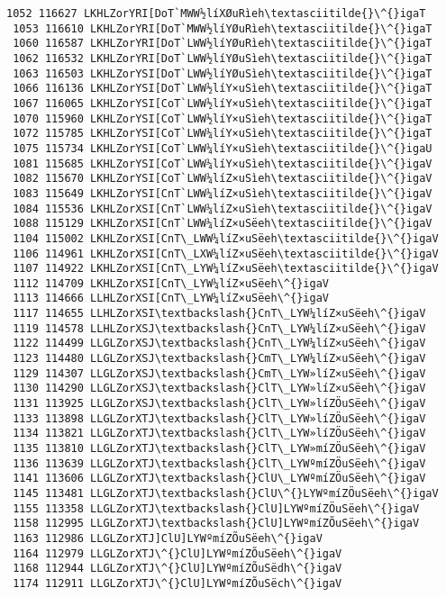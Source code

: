 \documentclass[11pt]{article}
\begin{document}
\begin{Verbatim}[commandchars=\\\{\}]
 1052 116627 LKHLZorYRI[DoT`MWW½líXØuRìeh\textasciitilde{}\^{}igaT
 1053 116610 LKHLZorYRI[DoT`MWW½líYØuRìeh\textasciitilde{}\^{}igaT
 1060 116587 LKHLZorYRI[DoT`LWW½líYØuRìeh\textasciitilde{}\^{}igaT
 1062 116532 LKHLZorYRI[DoT`LWW½líYØuSìeh\textasciitilde{}\^{}igaT
 1063 116503 LKHLZorYSI[DoT`LWW½líYØuSìeh\textasciitilde{}\^{}igaT
 1066 116136 LKHLZorYSI[DoT`LWW½líY×uSìeh\textasciitilde{}\^{}igaT
 1067 116065 LKHLZorYSI[CoT`LWW½líY×uSìeh\textasciitilde{}\^{}igaT
 1070 115960 LKHLZorYSI[CoT`LWW½líY×uSìeh\textasciitilde{}\^{}igaT
 1072 115785 LKHLZorYSI[CoT`LWW¼líY×uSìeh\textasciitilde{}\^{}igaT
 1075 115734 LKHLZorYSI[CoT`LWW¼líY×uSìeh\textasciitilde{}\^{}igaU
 1081 115685 LKHLZorYSI[CoT`LWW¼líY×uSìeh\textasciitilde{}\^{}igaV
 1082 115670 LKHLZorYSI[CoT`LWW¼líZ×uSìeh\textasciitilde{}\^{}igaV
 1083 115649 LKHLZorYSI[CnT`LWW¼líZ×uSìeh\textasciitilde{}\^{}igaV
 1084 115536 LKHLZorXSI[CnT`LWW¼líZ×uSìeh\textasciitilde{}\^{}igaV
 1088 115129 LKHLZorXSI[CnT`LWW¼líZ×uSëeh\textasciitilde{}\^{}igaV
 1104 115002 LKHLZorXSI[CnT\_LWW¼líZ×uSëeh\textasciitilde{}\^{}igaV
 1106 114961 LKHLZorXSI[CnT\_LXW¼líZ×uSëeh\textasciitilde{}\^{}igaV
 1107 114922 LKHLZorXSI[CnT\_LYW¼líZ×uSëeh\textasciitilde{}\^{}igaV
 1112 114709 LKHLZorXSI[CnT\_LYW¼líZ×uSëeh\^{}igaV
 1113 114666 LLHLZorXSI[CnT\_LYW¼líZ×uSëeh\^{}igaV
 1117 114655 LLHLZorXSI\textbackslash{}CnT\_LYW¼líZ×uSëeh\^{}igaV
 1119 114578 LLHLZorXSJ\textbackslash{}CnT\_LYW¼líZ×uSëeh\^{}igaV
 1122 114499 LLGLZorXSJ\textbackslash{}CnT\_LYW¼líZ×uSëeh\^{}igaV
 1123 114480 LLGLZorXSJ\textbackslash{}CmT\_LYW¼líZ×uSëeh\^{}igaV
 1129 114307 LLGLZorXSJ\textbackslash{}CmT\_LYW»líZ×uSëeh\^{}igaV
 1130 114290 LLGLZorXSJ\textbackslash{}ClT\_LYW»líZ×uSëeh\^{}igaV
 1131 113925 LLGLZorXSJ\textbackslash{}ClT\_LYW»líZÖuSëeh\^{}igaV
 1133 113898 LLGLZorXTJ\textbackslash{}ClT\_LYW»líZÖuSëeh\^{}igaV
 1134 113821 LLGLZorXTJ\textbackslash{}ClT\_LYW»líZÖuSëeh\^{}igaV
 1135 113810 LLGLZorXTJ\textbackslash{}ClT\_LYW»míZÖuSëeh\^{}igaV
 1136 113639 LLGLZorXTJ\textbackslash{}ClT\_LYWºmíZÖuSëeh\^{}igaV
 1141 113606 LLGLZorXTJ\textbackslash{}ClU\_LYWºmíZÖuSëeh\^{}igaV
 1145 113481 LLGLZorXTJ\textbackslash{}ClU\^{}LYWºmíZÖuSëeh\^{}igaV
 1155 113358 LLGLZorXTJ\textbackslash{}ClU]LYWºmíZÖuSëeh\^{}igaV
 1158 112995 LLGLZorXTJ\textbackslash{}ClU]LYWºmíZÕuSëeh\^{}igaV
 1163 112986 LLGLZorXTJ]ClU]LYWºmíZÕuSëeh\^{}igaV
 1164 112979 LLGLZorXTJ\^{}ClU]LYWºmíZÕuSëeh\^{}igaV
 1168 112944 LLGLZorXTJ\^{}ClU]LYWºmíZÕuSëdh\^{}igaV
 1174 112911 LLGLZorXTJ\^{}ClU]LYWºmíZÕuSëch\^{}igaV

\end{Verbatim}
\end{document}
